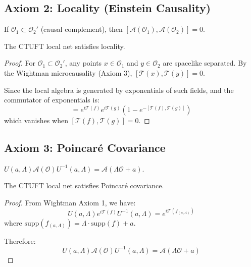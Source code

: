 \subsection{Axiom 2: Locality (Einstein Causality)}

\begin{axiom}[Locality]
If $\mathcal{O}_1 \subset \mathcal{O}_2'$ (causal complement), then $[\mathcal{A}(\mathcal{O}_1), \mathcal{A}(\mathcal{O}_2)] = 0$.
\end{axiom}

\begin{theorem}
The CTUFT local net satisfies locality.
\end{theorem}

\begin{proof}
For $\mathcal{O}_1 \subset \mathcal{O}_2'$, any points $x \in \mathcal{O}_1$ and $y \in \mathcal{O}_2$ are spacelike separated. By the Wightman microcausality (Axiom 3), $[\mathcal{T}(x), \mathcal{T}(y)] = 0$.

Since the local algebra is generated by exponentials of such fields, and the commutator of exponentials is:
\begin{equation}
    [e^{i\mathcal{T}(f)}, e^{i\mathcal{T}(g)}] = e^{i\mathcal{T}(f)} e^{i\mathcal{T}(g)} (1 - e^{-[\mathcal{T}(f), \mathcal{T}(g)]})
\end{equation}
which vanishes when $[\mathcal{T}(f), \mathcal{T}(g)] = 0$.
\end{proof}

\subsection{Axiom 3: Poincar\'{e} Covariance}

\begin{axiom}
$U(a, \Lambda) \mathcal{A}(\mathcal{O}) U^{-1}(a, \Lambda) = \mathcal{A}(\Lambda \mathcal{O} + a)$.
\end{axiom}

\begin{theorem}
The CTUFT local net satisfies Poincar\'{e} covariance.
\end{theorem}

\begin{proof}
From Wightman Axiom 1, we have:
\begin{equation}
    U(a, \Lambda) e^{i\mathcal{T}(f)} U^{-1}(a, \Lambda) = e^{i\mathcal{T}(f_{(a,\Lambda)})}
\end{equation}
where $\text{supp}(f_{(a,\Lambda)}) = \Lambda \cdot \text{supp}(f) + a$.

Therefore:
\begin{equation}
    U(a, \Lambda) \mathcal{A}(\mathcal{O}) U^{-1}(a, \Lambda) = \mathcal{A}(\Lambda \mathcal{O} + a)
\end{equation}
\end{proof}

